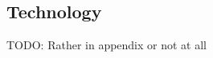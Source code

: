 \documentclass[12pt,a4paper]{article}
\begin{document}
%
%
%
%
%
%
%
%
%
%
%
%
%
%
%
%






\subsection{Technology}

TODO: Rather in appendix or not at all
\end{document}
